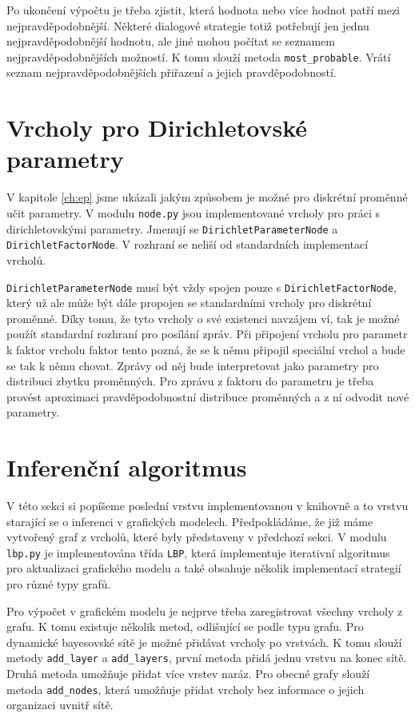 Po ukončení výpočtu je třeba zjistit, která hodnota nebo více hodnot patří mezi nejpravděpodobnější.
Některé dialogové strategie totiž potřebují jen jednu nejpravděpodobnější hodnotu, ale jiné mohou počítat se seznamem nejpravděpodobnějších možností. 
K tomu slouží metoda \texttt{most\_probable}.
Vrátí seznam nejpravděpodobnějších přiřazení a jejich pravděpodobností.

\section{Vrcholy pro Dirichletovské parametry}

V kapitole \ref{ch:ep} jsme ukázali jakým způsobem je možné pro diskrétní proměnné učit parametry.
V modulu \texttt{node.py} jsou implementované vrcholy pro práci s dirichletovskými parametry.
Jmenují se \texttt{DirichletParameterNode} a \texttt{DirichletFactorNode}.
V rozhraní se neliší od standardních implementací vrcholů.

\texttt{DirichletParameterNode} musí být vždy spojen pouze s \texttt{DirichletFactorNode}, který už ale může být dále propojen se standardními vrcholy pro diskrétní proměnné.
Díky tomu, že tyto vrcholy o své existenci navzájem ví, tak je možné použít standardní rozhraní pro posílání zpráv.
Při připojení vrcholu pro parametr k faktor vrcholu faktor tento pozná, že se k němu připojil speciální vrchol a bude se tak k němu chovat.
Zprávy od něj bude interpretovat jako parametry pro distribuci zbytku proměnných.
Pro zprávu z faktoru do parametru je třeba provést aproximaci pravděpodobnostní distribuce proměnných a z ní odvodit nové parametry.

\section{Inferenční algoritmus}

V této sekci si popíšeme poslední vrstvu implementovanou v knihovně a to vrstvu starající se o inferenci v grafických modelech.
Předpokládáme, že již máme vytvořený graf z vrcholů, které byly představeny v předchozí sekci.
V modulu \texttt{lbp.py} je implementována třída \texttt{LBP}, která implementuje iterativní algoritmus pro aktualizaci grafického modelu a také obsahuje několik implementací strategií pro různé typy grafů.

Pro výpočet v grafickém modelu je nejprve třeba zaregistrovat všechny vrcholy z grafu.
K tomu existuje několik metod, odlišující se podle typu grafu.
Pro dynamické bayesovské sítě je možné přidávat vrcholy po vrstvách.
K tomu slouží metody \texttt{add\_layer} a \texttt{add\_layers}, první metoda přidá jednu vrstvu na konec sítě.
Druhá metoda umožňuje přidat více vrstev naráz.
Pro obecné grafy slouží metoda \texttt{add\_nodes}, která umožňuje přidat vrcholy bez informace o jejich organizaci uvnitř sítě.

